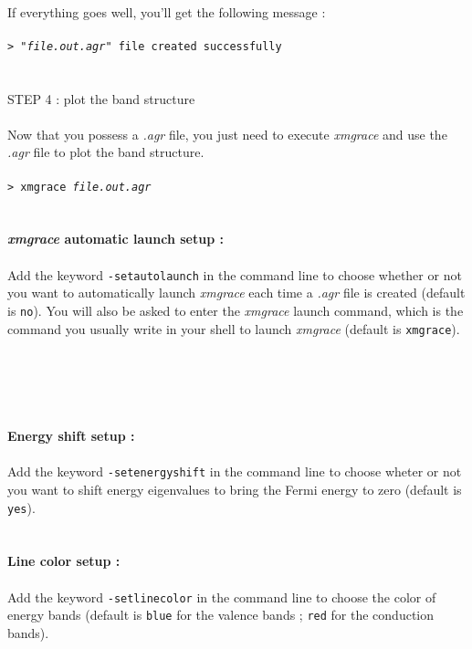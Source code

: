 \documentclass{article}
\begin{document}
\\
If everything goes well, you'll get the following message : \\
\\
\texttt{> "\textit{file.out.agr}"  file created successfully} \\
\\
\\
{\large{STEP 4 : plot the band structure}} \\
\\
Now that you possess a \textit{.agr} file, you just need to execute \textit{xmgrace} and use the \textit{.agr} file to plot the band structure. \\
\\
\texttt{> xmgrace \textit{file.out.agr}} \\
\\
\\
{\Large\textbf{\textit{xmgrace} automatic launch setup :}} \\
\\
Add the keyword \texttt{-setautolaunch} in the command line to choose whether or not you want to automatically launch \textit{xmgrace} each time a \textit{.agr} file is created (default is \texttt{no}). You will also be asked to enter the \textit{xmgrace} launch command, which is the command you usually write in your shell to launch \textit{xmgrace} (default is \texttt{xmgrace}). \\
\\
\\
\\
\\
\\
{\Large\textbf{Energy shift setup :}} \\
\\
Add the keyword \texttt{-setenergyshift} in the command line to choose wheter or not you want to shift energy eigenvalues to bring the Fermi energy to zero (default is \texttt{yes}). \\
\\
\\
{\Large\textbf{Line color setup :}} \\
\\
Add the keyword \texttt{-setlinecolor} in the command line to choose the color of energy bands (default is \texttt{blue} for the valence bands ; \texttt{red} for the conduction bands). \\
\end{document}
